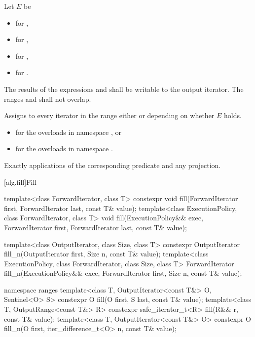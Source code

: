 \begin{itemdescr}
\pnum
Let $E$ be
\begin{itemize}
\item {}
  for ,
\item {}
  for ,
\item {}
  for ,
\item {}
  for .
\end{itemize}

\pnum
\requires
The results of the expressions
and
shall be writable to the
output iterator.
The ranges
and
shall not overlap.

\pnum
\effects
Assigns to every iterator
in the
range
either
or
depending on whether $E$ holds.

\pnum
\returns
\begin{itemize}
\item {} for the overloads in
  namespace , or
\item {} for the overloads in
  namespace .
\end{itemize}

\pnum
\complexity
Exactly
applications of the corresponding predicate and any projection.
\end{itemdescr}

[alg.fill]{Fill}

%
%
\begin{itemdecl}
template<class ForwardIterator, class T>
  constexpr void fill(ForwardIterator first, ForwardIterator last, const T& value);
template<class ExecutionPolicy, class ForwardIterator, class T>
  void fill(ExecutionPolicy&& exec,
            ForwardIterator first, ForwardIterator last, const T& value);

template<class OutputIterator, class Size, class T>
  constexpr OutputIterator fill_n(OutputIterator first, Size n, const T& value);
template<class ExecutionPolicy, class ForwardIterator, class Size, class T>
  ForwardIterator fill_n(ExecutionPolicy&& exec,
                         ForwardIterator first, Size n, const T& value);


namespace ranges {
  template<class T, OutputIterator<const T&> O, Sentinel<O> S>
    constexpr O fill(O first, S last, const T& value);
  template<class T, OutputRange<const T&> R>
    constexpr safe_iterator_t<R> fill(R&& r, const T& value);
  template<class T, OutputIterator<const T&> O>
    constexpr O fill_n(O first, iter_difference_t<O> n, const T& value);
}
\end{itemdecl}

